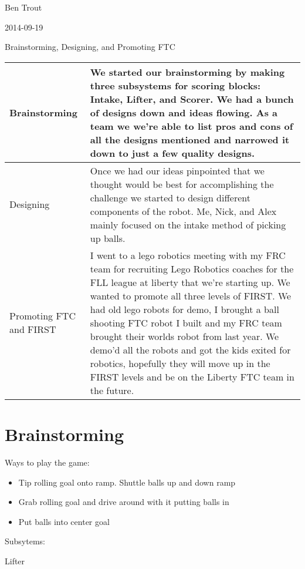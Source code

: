 Ben Trout

2014-09-19

Brainstorming, Designing, and Promoting FTC

\begin{tabular}{|p{5cm}|p{5cm}|}
 \hline
 Brainstorming&
 We started our brainstorming by making three subsystems for scoring blocks:
 Intake, Lifter, and Scorer. We had a bunch of designs down and ideas flowing.
 As a team we we’re able to list pros and cons of all the designs mentioned and narrowed
 it down to just a few quality designs.
 \\
 \hline
 Designing&
 Once we had our ideas pinpointed that we thought would be best for accomplishing
 the challenge we started to design different components of the robot.
 Me, Nick, and Alex mainly focused on the intake method of picking up balls.
 \\
 \hline
 Promoting FTC and FIRST&
 I went to a lego robotics meeting with my FRC team for recruiting Lego Robotics coaches
 for the FLL league at liberty that we’re starting up. We wanted to promote all three
 levels of FIRST. We had old lego robots for demo, I brought a ball shooting FTC robot
 I built and my FRC team brought their worlds robot from last year.
 We demo’d all the robots and got the kids exited for robotics, hopefully they will
 move up in the FIRST levels and be on the Liberty FTC team in the future.
 \\
 \hline
\end{tabular}

\section*{Brainstorming}
Ways to play the game:
\begin{itemize}
 \item Tip rolling goal onto ramp. Shuttle balls up and down ramp
 \item Grab rolling goal and drive around with it putting balls in
 \item Put balls into center goal %
\end{itemize}
Subsytems:
 \item Lifter

